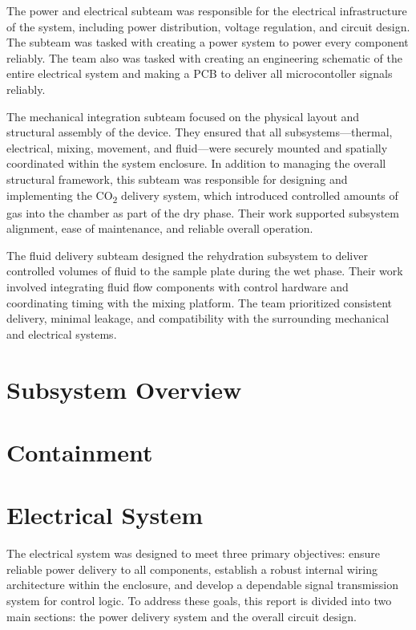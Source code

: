 \documentclass[12pt]{article}
\begin{document}
    The power and electrical subteam was responsible for the electrical infrastructure of the system, including power distribution, voltage regulation, and circuit design. The subteam was tasked with creating a power system to power every component reliably. The team also was tasked with creating an engineering schematic of the entire electrical system and making a PCB to deliver all microcontoller signals reliably. 
    
    The mechanical integration subteam focused on the physical layout and structural assembly of the device. They ensured that all subsystems—thermal, electrical, mixing, movement, and fluid—were securely mounted and spatially coordinated within the system enclosure. In addition to managing the overall structural framework, this subteam was responsible for designing and implementing the CO\textsubscript{2} delivery system, which introduced controlled amounts of gas into the chamber as part of the dry phase. Their work supported subsystem alignment, ease of maintenance, and reliable overall operation.
    
    The fluid delivery subteam designed the rehydration subsystem to deliver controlled volumes of fluid to the sample plate during the wet phase. Their work involved integrating fluid flow components with control hardware and coordinating timing with the mixing platform. The team prioritized consistent delivery, minimal leakage, and compatibility with the surrounding mechanical and electrical systems.

    
    \section{Subsystem Overview}

    \section{Containment}

    \section{Electrical System}

        The electrical system was designed to meet three primary objectives: ensure reliable power delivery to all components, establish a robust internal wiring architecture within the enclosure, and develop a dependable signal transmission system for control logic. To address these goals, this report is divided into two main sections: the power delivery system and the overall circuit design.
    
\end{document}
